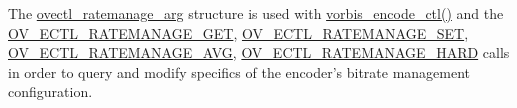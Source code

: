 The \hyperlink{structovectl__ratemanage__arg}{ovectl\+\_\+ratemanage\+\_\+arg} structure is used with \hyperlink{vorbisenc_8h_a5f398a378e20b8ce5e3341a582e773bd}{vorbis\+\_\+encode\+\_\+ctl()} and the \hyperlink{vorbisenc_8h_a614481c0d84bdfbb80eed9208b68f779}{O\+V\+\_\+\+E\+C\+T\+L\+\_\+\+R\+A\+T\+E\+M\+A\+N\+A\+G\+E\+\_\+\+G\+E\+T}, \hyperlink{vorbisenc_8h_a1daa1fd8ce1064cce01dde3ad447d389}{O\+V\+\_\+\+E\+C\+T\+L\+\_\+\+R\+A\+T\+E\+M\+A\+N\+A\+G\+E\+\_\+\+S\+E\+T}, \hyperlink{vorbisenc_8h_a34c3170d227b6368041e59c1dc7ed6e4}{O\+V\+\_\+\+E\+C\+T\+L\+\_\+\+R\+A\+T\+E\+M\+A\+N\+A\+G\+E\+\_\+\+A\+V\+G}, \hyperlink{vorbisenc_8h_af8869980a805f431af57a50dffbf5d33}{O\+V\+\_\+\+E\+C\+T\+L\+\_\+\+R\+A\+T\+E\+M\+A\+N\+A\+G\+E\+\_\+\+H\+A\+R\+D} calls in order to query and modify specifics of the encoder's bitrate management configuration. 

